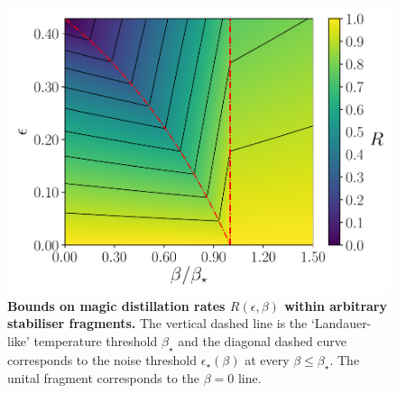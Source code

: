 \documentclass[pra,
aps,
twocolumn,
superscriptaddress,
groupedaddress,
nofootinbib,
reprint
]{revtex4-1}
\begin{document}
\begin{figure}[t!]
    \centering
    \includegraphics[scale=0.55]{figs/rate_scatter.pdf}
    \caption{\textbf{Bounds on magic distillation rates $R(\epsilon, \beta)$ within arbitrary stabiliser fragments.}
    The vertical dashed line is the `Landauer-like' temperature threshold $\beta_\star$ and the diagonal dashed curve corresponds to the noise threshold $\epsilon_\star (\beta)$ at every $\beta \leq \beta_\star$. The unital fragment corresponds to the $\beta =0 $ line.
    }
    \label{fig:rate_contour}
\end{figure}
\end{document}
